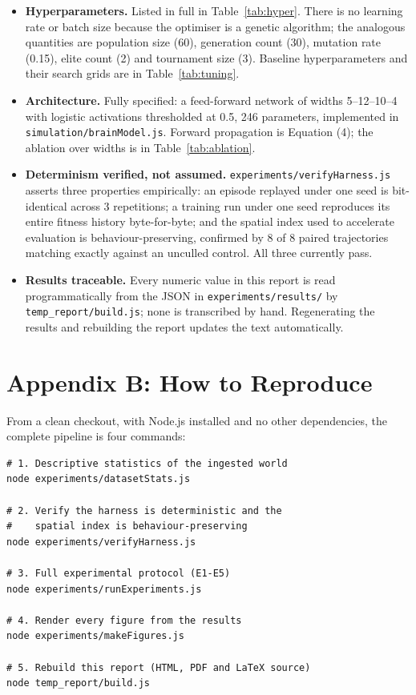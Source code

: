 \documentclass[conference]{IEEEtran}
\begin{document}
\begin{itemize}
\item[$\boxtimes$] \textbf{Hyperparameters.} Listed in full in Table~\ref{tab:hyper}. There is no learning rate or batch size because the optimiser is a genetic algorithm; the analogous quantities are population size (60), generation count (30), mutation rate (0.15), elite count (2) and tournament size (3). Baseline hyperparameters and their search grids are in Table~\ref{tab:tuning}.
\item[$\boxtimes$] \textbf{Architecture.} Fully specified: a feed-forward network of widths 5–12–10–4 with logistic activations thresholded at 0.5, 246 parameters, implemented in \texttt{simulation/brainModel.js}. Forward propagation is Equation (4); the ablation over widths is in Table~\ref{tab:ablation}.
\item[$\boxtimes$] \textbf{Determinism verified, not assumed.} \texttt{experiments/verifyHarness.js} asserts three properties empirically: an episode replayed under one seed is bit-identical across 3 repetitions; a training run under one seed reproduces its entire fitness history byte-for-byte; and the spatial index used to accelerate evaluation is behaviour-preserving, confirmed by 8 of 8 paired trajectories matching exactly against an unculled control. All three currently pass.
\item[$\boxtimes$] \textbf{Results traceable.} Every numeric value in this report is read programmatically from the JSON in \texttt{experiments/results/} by \texttt{temp\_report/build.js}; none is transcribed by hand. Regenerating the results and rebuilding the report updates the text automatically.
\end{itemize}

\section*{Appendix B: How to Reproduce}

\label{sec:appB}

From a clean checkout, with Node.js installed and no other dependencies, the complete pipeline is four commands:

\begin{verbatim}
# 1. Descriptive statistics of the ingested world
node experiments/datasetStats.js

# 2. Verify the harness is deterministic and the
#    spatial index is behaviour-preserving
node experiments/verifyHarness.js

# 3. Full experimental protocol (E1-E5)
node experiments/runExperiments.js

# 4. Render every figure from the results
node experiments/makeFigures.js

# 5. Rebuild this report (HTML, PDF and LaTeX source)
node temp_report/build.js
\end{verbatim}
\end{document}
